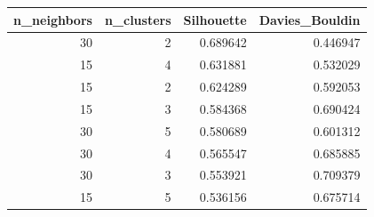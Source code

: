 \begin{tabular}{rrrr}
\toprule
n\_neighbors & n\_clusters & Silhouette & Davies\_Bouldin \\
\midrule
30 & 2 & 0.689642 & 0.446947 \\
15 & 4 & 0.631881 & 0.532029 \\
15 & 2 & 0.624289 & 0.592053 \\
15 & 3 & 0.584368 & 0.690424 \\
30 & 5 & 0.580689 & 0.601312 \\
30 & 4 & 0.565547 & 0.685885 \\
30 & 3 & 0.553921 & 0.709379 \\
15 & 5 & 0.536156 & 0.675714 \\
\bottomrule
\end{tabular}
